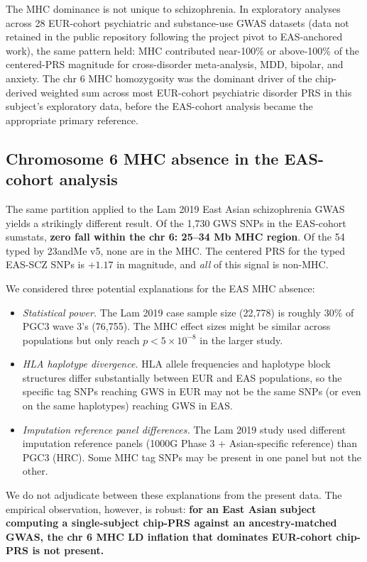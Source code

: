 \documentclass[11pt,a4paper]{article}
\begin{document}
The MHC dominance is not unique to schizophrenia. In exploratory analyses across 28 EUR-cohort psychiatric and substance-use GWAS datasets (data not retained in the public repository following the project pivot to EAS-anchored work), the same pattern held: MHC contributed near-100\% or above-100\% of the centered-PRS magnitude for cross-disorder meta-analysis, MDD, bipolar, and anxiety. The chr 6 MHC homozygosity was the dominant driver of the chip-derived weighted sum across most EUR-cohort psychiatric disorder PRS in this subject's exploratory data, before the EAS-cohort analysis became the appropriate primary reference.

\subsection{Chromosome 6 MHC absence in the EAS-cohort analysis}

The same partition applied to the Lam 2019 East Asian schizophrenia GWAS yields a strikingly different result. Of the 1{,}730 GWS SNPs in the EAS-cohort sumstats, \textbf{zero fall within the chr 6: 25--34 Mb MHC region}. Of the 54 typed by 23andMe v5, none are in the MHC. The centered PRS for the typed EAS-SCZ SNPs is $+1.17$ in magnitude, and \emph{all} of this signal is non-MHC.

We considered three potential explanations for the EAS MHC absence:
\begin{itemize}
\item \emph{Statistical power.} The Lam 2019 case sample size (22{,}778) is roughly 30\% of PGC3 wave 3's (76{,}755). The MHC effect sizes might be similar across populations but only reach $p < 5 \times 10^{-8}$ in the larger study.
\item \emph{HLA haplotype divergence.} HLA allele frequencies and haplotype block structures differ substantially between EUR and EAS populations, so the specific tag SNPs reaching GWS in EUR may not be the same SNPs (or even on the same haplotypes) reaching GWS in EAS.
\item \emph{Imputation reference panel differences.} The Lam 2019 study used different imputation reference panels (1000G Phase 3 + Asian-specific reference) than PGC3 (HRC). Some MHC tag SNPs may be present in one panel but not the other.
\end{itemize}

We do not adjudicate between these explanations from the present data. The empirical observation, however, is robust: \textbf{for an East Asian subject computing a single-subject chip-PRS against an ancestry-matched GWAS, the chr 6 MHC LD inflation that dominates EUR-cohort chip-PRS is not present.}
\end{document}
